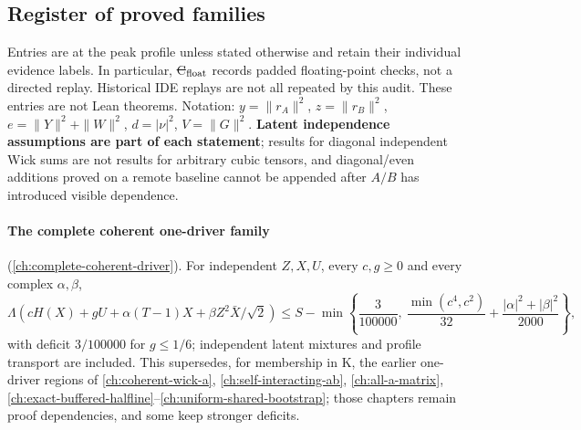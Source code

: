 \subsection{Register of proved families}
Entries are at the peak profile unless stated otherwise and retain their individual evidence labels. In particular, \st{C$_{\rm float}$} records padded floating-point checks, not a directed replay. Historical IDE replays are not all repeated by this audit. These entries are not Lean theorems. Notation: $y=\|r_A\|^2$, $z=\|r_B\|^2$, $e=\|Y\|^2+\|W\|^2$,
$d=|\nu|^2$, $V=\|G\|^2$. \textbf{Latent independence assumptions are part of each statement}; results for diagonal independent Wick sums are not results for arbitrary
cubic tensors, and diagonal/even additions proved on a remote baseline cannot be appended after $A/B$ has introduced visible dependence.

\paragraph{The complete coherent one-driver family} (\autoref{ch:complete-coherent-driver}). For independent $Z,X,U$, every $c,g\ge0$ and every complex
$\alpha,\beta$,
\[
 \Lambda\!\left(cH(X)+gU+\alpha(T-1)X+\beta Z^2\bar X/\sqrt2\right)
 \le S-\min\!\left\{\frac3{100000},\ \frac{\min(c^4,c^2)}{32}+\frac{|\alpha|^2+|\beta|^2}{2000}\right\},
\]
with deficit $3/100000$ for $g\le1/6$; independent latent mixtures and profile transport are included. This supersedes, for membership in K, the earlier one-driver
regions of \autoref{ch:coherent-wick-a}, \autoref{ch:self-interacting-ab}, \autoref{ch:all-a-matrix}, \autoref{ch:exact-buffered-halfline}--\autoref{ch:uniform-shared-bootstrap};
those chapters remain proof dependencies, and some keep stronger deficits.

